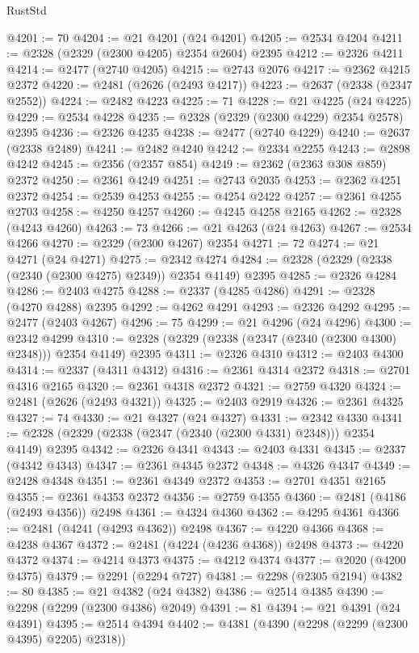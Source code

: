 \begin{lexlean}{RustStd}
\begin{coremodule}
@4201 := 70
@4204 := @21 @4201 (@24 @4201)
@4205 := @2534 @4204
@4211 := @2328 (@2329 (@2300 @4205) @2354 @2604) @2395
@4212 := @2326 @4211
@4214 := @2477 (@2740 @4205)
@4215 := @2743 @2076
@4217 := @2362 @4215 @2372
@4220 := @2481 (@2626 (@2493 @4217))
@4223 := @2637 (@2338 (@2347 @2552))
@4224 := @2482 @4223
@4225 := 71
@4228 := @21 @4225 (@24 @4225)
@4229 := @2534 @4228
@4235 := @2328 (@2329 (@2300 @4229) @2354 @2578) @2395
@4236 := @2326 @4235
@4238 := @2477 (@2740 @4229)
@4240 := @2637 (@2338 @2489)
@4241 := @2482 @4240
@4242 := @2334 @2255
@4243 := @2898 @4242
@4245 := @2356 (@2357 @854)
@4249 := @2362 (@2363 @308 @859) @2372
@4250 := @2361 @4249
@4251 := @2743 @2035
@4253 := @2362 @4251 @2372
@4254 := @2539 @4253
@4255 := @4254 @2422
@4257 := @2361 @4255 @2703
@4258 := @4250 @4257
@4260 := @4245 @4258 @2165
@4262 := @2328 (@4243 @4260)
@4263 := 73
@4266 := @21 @4263 (@24 @4263)
@4267 := @2534 @4266
@4270 := @2329 (@2300 @4267) @2354
@4271 := 72
@4274 := @21 @4271 (@24 @4271)
@4275 := @2342 @4274
@4284 := @2328 (@2329 (@2338 (@2340 (@2300 @4275) @2349)) @2354 @4149) @2395
@4285 := @2326 @4284
@4286 := @2403 @4275
@4288 := @2337 (@4285 @4286)
@4291 := @2328 (@4270 @4288) @2395
@4292 := @4262 @4291
@4293 := @2326 @4292
@4295 := @2477 (@2403 @4267)
@4296 := 75
@4299 := @21 @4296 (@24 @4296)
@4300 := @2342 @4299
@4310 := @2328 (@2329 (@2338 (@2347 (@2340 (@2300 @4300) @2348))) @2354 @4149) @2395
@4311 := @2326 @4310
@4312 := @2403 @4300
@4314 := @2337 (@4311 @4312)
@4316 := @2361 @4314 @2372
@4318 := @2701 @4316 @2165
@4320 := @2361 @4318 @2372
@4321 := @2759 @4320
@4324 := @2481 (@2626 (@2493 @4321))
@4325 := @2403 @2919
@4326 := @2361 @4325
@4327 := 74
@4330 := @21 @4327 (@24 @4327)
@4331 := @2342 @4330
@4341 := @2328 (@2329 (@2338 (@2347 (@2340 (@2300 @4331) @2348))) @2354 @4149) @2395
@4342 := @2326 @4341
@4343 := @2403 @4331
@4345 := @2337 (@4342 @4343)
@4347 := @2361 @4345 @2372
@4348 := @4326 @4347
@4349 := @2428 @4348
@4351 := @2361 @4349 @2372
@4353 := @2701 @4351 @2165
@4355 := @2361 @4353 @2372
@4356 := @2759 @4355
@4360 := @2481 (@4186 (@2493 @4356)) @2498
@4361 := @4324 @4360
@4362 := @4295 @4361
@4366 := @2481 (@4241 (@4293 @4362)) @2498
@4367 := @4220 @4366
@4368 := @4238 @4367
@4372 := @2481 (@4224 (@4236 @4368)) @2498
@4373 := @4220 @4372
@4374 := @4214 @4373
@4375 := @4212 @4374
@4377 := @2020 (@4200 @4375)
@4379 := @2291 (@2294 @727)
@4381 := @2298 (@2305 @2194)
@4382 := 80
@4385 := @21 @4382 (@24 @4382)
@4386 := @2514 @4385
@4390 := @2298 (@2299 (@2300 @4386) @2049)
@4391 := 81
@4394 := @21 @4391 (@24 @4391)
@4395 := @2514 @4394
@4402 := @4381 (@4390 (@2298 (@2299 (@2300 @4395) @2205) @2318))

\end{coremodule}
\end{lexlean}
